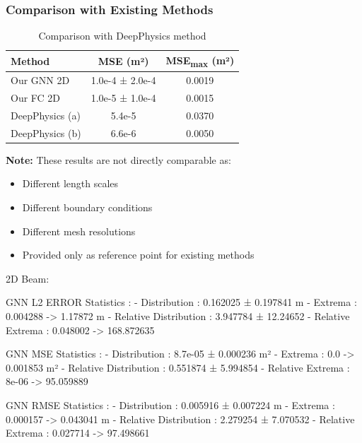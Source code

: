 \documentclass{beamer}
\begin{document}
\begin{frame}
    \frametitle{Comparison with Existing Methods}
    \begin{table}[h]
        \small
        \centering
        \begin{tabular}{|l|c|c|}
            \hline
            \textbf{Method} & \textbf{MSE (m²)} & \textbf{MSE\textsubscript{max} (m²)} \\ \hline
            Our GNN 2D & 1.0e-4 ± 2.0e-4 & 0.0019 \\ \hline
            Our FC 2D & 1.0e-5 ± 1.0e-4 & 0.0015 \\ \hline
            DeepPhysics (a) & 5.4e-5 & 0.0370 \\ \hline
            DeepPhysics (b) & 6.6e-6 & 0.0050 \\ \hline
        \end{tabular}
        \caption{Comparison with DeepPhysics method}
    \end{table}
    
    \vspace{0.3cm}
    \small{
    \textbf{Note:} These results are not directly comparable as:
    \begin{itemize}
        \item Different length scales
        \item Different boundary conditions
        \item Different mesh resolutions
        \item Provided only as reference point for existing methods
    \end{itemize}
    }
\end{frame}



\iffalse
2D Beam:

GNN L2 ERROR Statistics :
        - Distribution : 0.162025 ± 0.197841 m
        - Extrema : 0.004288 -> 1.17872 m
        - Relative Distribution : 3.947784 ± 12.24652 %
        - Relative Extrema : 0.048002 -> 168.872635 %

GNN MSE Statistics :
        - Distribution : 8.7e-05 ± 0.000236 m²
        - Extrema : 0.0 -> 0.001853 m²
        - Relative Distribution : 0.551874 ± 5.994854 %
        - Relative Extrema : 8e-06 -> 95.059889 %

GNN RMSE Statistics :
        - Distribution : 0.005916 ± 0.007224 m
        - Extrema : 0.000157 -> 0.043041 m
        - Relative Distribution : 2.279254 ± 7.070532 %
        - Relative Extrema : 0.027714 -> 97.498661 %
\end{document}
